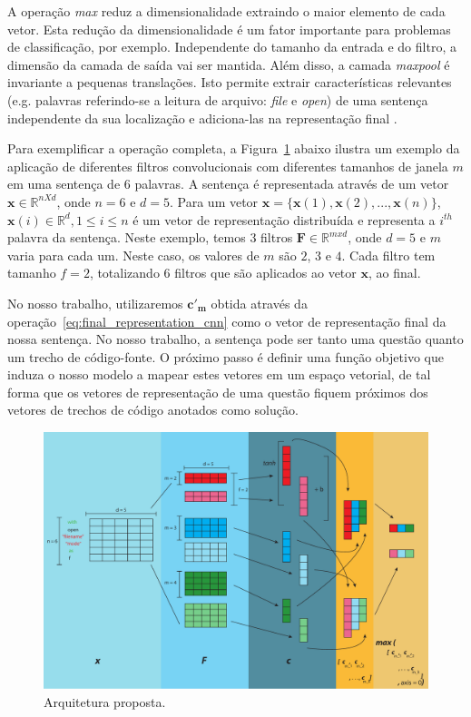 A operação \textit{max} reduz a dimensionalidade extraindo o maior elemento de cada vetor. Esta redução da dimensionalidade é um fator importante para problemas de classificação, por exemplo. Independente do tamanho da entrada e do filtro, a dimensão da camada de saída vai ser mantida. Além disso, a camada \textit{maxpool} é invariante a pequenas translações. Isto permite extrair características relevantes (e.g. palavras referindo-se a leitura de arquivo: \emph{file} e \emph{open}) de uma sentença independente da sua localização e adiciona-las na representação final \citep{tom-young:trends-deep-learning-nlp}.

Para exemplificar a operação completa, a Figura~\ref{fig:cnn-architecture-proposal} abaixo ilustra um exemplo da aplicação de diferentes filtros convolucionais com diferentes tamanhos de janela $m$ em uma sentença de 6 palavras. A sentença é representada através de um vetor $\bm{x} \in \mathbb{R}^{n X d}$, onde $n = 6$ e $d = 5$. Para um vetor $\bm{x} = \{\bm{x}(1), \bm{x}(2), . . ., \bm{x}(n) \}$, $\bm{x}(i) \in \mathbb{R}^{d}, 1 \leq i \leq n$ é um vetor de representação distribuída e representa a $i^{th}$ palavra da sentença. Neste exemplo, temos 3 filtros $\bm{F} \in \mathbb{R}^{m x d}$, onde $d = 5$ e $m$ varia para cada um. Neste caso, os valores de $m$ são $2$, $3$ e $4$. Cada filtro tem tamanho $f = 2$, totalizando 6 filtros que são aplicados ao vetor $\bm{x}$, ao final.

No nosso trabalho, utilizaremos $\bm{c'}_{\bm{m}}$ obtida através da operação~\ref{eq:final_representation_cnn} como o vetor de representação final da nossa sentença. No nosso trabalho, a sentença pode ser tanto uma questão quanto um trecho de código-fonte. O próximo passo é definir uma função objetivo que induza o nosso modelo a mapear estes vetores em um espaço vetorial, de tal forma que os vetores de representação de uma questão fiquem próximos dos vetores de trechos de código anotados como solução.

\begin{figure}[h]
    \centering
    \includegraphics[width=1\textwidth]{figuras/cap-problema/cnn-architecture.pdf}
    \caption{Arquitetura proposta.}
    \label{fig:cnn-architecture-proposal}
\end{figure}




